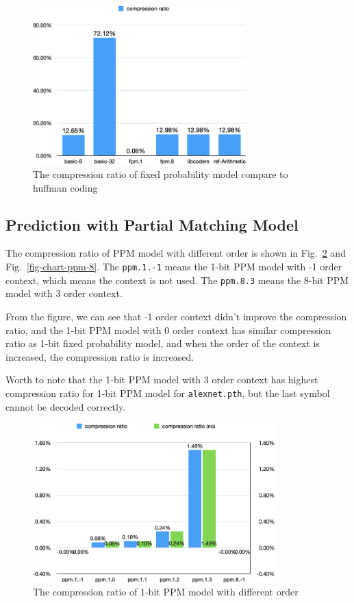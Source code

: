 \documentclass[a4paper,conference]{IEEEtran}
\begin{document}
\begin{figure}[htbp]
\centerline{\includegraphics[height=6.15cm, keepaspectratio,]{assets/chart-fpm-comp.png}}
\caption{The compression ratio of fixed probability model compare to huffman coding}
\label{fig-chart-fpm-comp}
\end{figure}

\subsection{Prediction with Partial Matching Model}

The compression ratio of PPM model with different order is shown in Fig.~\ref{fig-chart-ppm-1} and Fig.~\ref{fig-chart-ppm-8}. The \texttt{ppm.1.-1} means the 1-bit PPM model with -1 order context, which means the context is not used. The \texttt{ppm.8.3} means the 8-bit PPM model with 3 order context.

From the figure, we can see that -1 order context didn't improve the compression ratio, and the 1-bit PPM model with 0 order context has similar compression ratio as 1-bit fixed probability model, and when the order of the context is increased, the compression ratio is increased.

Worth to note that the 1-bit PPM model with 3 order context has highest compression ratio for 1-bit PPM model for \texttt{alexnet.pth}, but the last symbol cannot be decoded correctly.

\begin{figure}[htbp]
\centerline{\includegraphics[height=6.15cm, keepaspectratio,]{assets/chart-ppm-1-2.png}}
\caption{The compression ratio of 1-bit PPM model with different order}
\label{fig-chart-ppm-1}
\end{figure}
\end{document}
